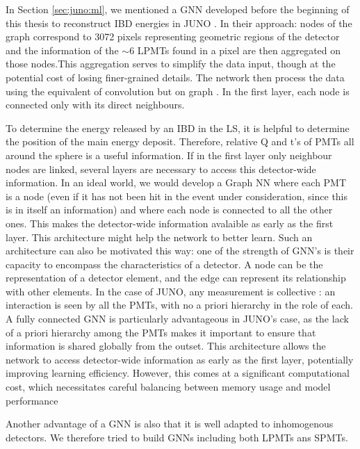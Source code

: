\documentclass[../main.tex]{subfiles}
\begin{document}
In Section \ref{sec:juno:ml}, we mentioned a GNN developed before the beginning of this thesis to reconstruct IBD energies in JUNO \cite{qian_vertex_2021}. In their approach:
nodes of the graph correspond to 3072 pixels representing geometric regions of the detector and the information of the $\sim6$ LPMTs found in a pixel are then aggregated on those nodes.This aggregation serves to simplify the data input, though at the potential cost of losing finer-grained details.
The network then process the data using the equivalent of convolution but on graph \cite{defferrard_convolutional_2017}. In the first layer, each node is connected only with its direct neighbours.

To determine the energy released by an IBD in the LS, it is helpful to determine the position of the main energy deposit. Therefore, relative Q and t's of PMTs all around the sphere is a useful information. If in the first layer only neighbour nodes are linked, several layers are necessary to access this detector-wide information. In an ideal world, we would develop a Graph NN where each PMT is a node
(even if it has not been hit in the event under consideration, since this is in itself an information) and where each node is connected to all the other ones. This makes the detector-wide information avalaible as early as the first layer. This architecture
might help the network to better learn. Such an architecture can also be motivated this way: one of the strength of GNN's is their capacity to encompass the characteristics of a detector.
A node can be the representation of a detector element, and the edge can represent its relationship with other elements. In the case of JUNO, any measurement is collective : an interaction is seen by all the PMTs, with no a priori hierarchy in the role of each.
A fully connected GNN is particularly advantageous in JUNO's case, as the lack of a priori hierarchy among the PMTs makes it important to ensure that information is shared globally from the outset. This architecture allows the network to access detector-wide information as early as the first layer, potentially improving learning efficiency. However, this comes at a significant computational cost, which necessitates careful balancing between memory usage and model performance

Another advantage of a GNN is also that it is well adapted to inhomogenous detectors.
We therefore tried to build GNNs including both LPMTs ans SPMTs.
\end{document}
